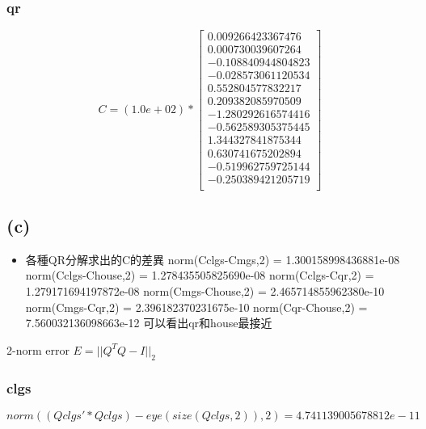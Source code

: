 \documentclass{article}
\begin{document}
            \subsubsection*{qr}
            \[
                C = (1.0e+02) * \left[
                \begin{array}{c}
                    0.009266423367476\\
                    0.000730039607264\\
                    -0.108840944804823\\
                    -0.028573061120534\\
                    0.552804577832217\\
                    0.209382085970509\\
                    -1.280292616574416\\
                    -0.562589305375445\\
                    1.344327841875344\\
                    0.630741675202894\\
                    -0.519962759725144\\
                    -0.250389421205719\\
                \end{array}
                \right]
            \]
        \newpage
        \subsection*{(c)}
            \begin{itemize}
                \item 各種QR分解求出的C的差異
                    \subitem norm(Cclgs-Cmgs,2) = 1.300158998436881e-08
                    \subitem norm(Cclgs-Chouse,2) = 1.278435505825690e-08 
                    \subitem norm(Cclgs-Cqr,2) = 1.279171694197872e-08
                    \subitem norm(Cmgs-Chouse,2) = 2.465714855962380e-10
                    \subitem norm(Cmgs-Cqr,2) = 2.396182370231675e-10
                    \subitem norm(Cqr-Chouse,2) = 7.560032136098663e-12
                    \subitem 可以看出qr和house最接近
            \end{itemize}
                2-norm error $E = ||Q^TQ-I||_2$
            \subsubsection*{clgs}
                \[
                    norm((Qclgs'*Qclgs)-eye(size(Qclgs,2)),2) = 4.741139005678812e-11    
                \]
\end{document}
